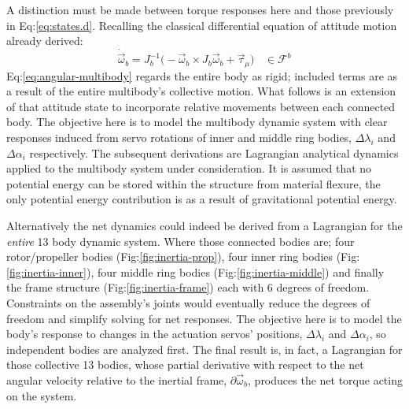 \par
A distinction must be made between torque responses here and those previously in Eq:\ref{eq:states.d}. Recalling the classical differential equation of attitude motion already derived:
\begin{equation}\label{eq:angular-multibody}
\dot{\vec{\omega}}_b=J_b^{-1}\big(-\vec{\omega}_b\times J_b\vec{\omega}_b+\vec{\tau}_\mu\big)~~~~\in\mathcal{F}^b
\end{equation}
Eq:\ref{eq:angular-multibody} regards the entire body as rigid; included terms are as a result of the entire multibody's collective motion. What follows is an extension of that attitude state to incorporate relative movements between each connected body. The objective here is to model the multibody dynamic system with clear responses induced from servo rotations of inner and middle ring bodies, $\Delta\lambda_i$ and $\Delta\alpha_i$ respectively. The subsequent derivations are Lagrangian analytical dynamics applied to the multibody system under consideration. It is assumed that no potential energy can be stored within the structure from material flexure, the only potential energy contribution is as a result of gravitational potential energy.
\par
Alternatively the net dynamics could indeed be derived from a Lagrangian for the \emph{entire} 13 body dynamic system. Where those connected bodies are; four rotor/propeller bodies (Fig:\ref{fig:inertia-prop}), four inner ring bodies (Fig:\ref{fig:inertia-inner}), four middle ring bodies (Fig:\ref{fig:inertia-middle}) and finally the frame structure (Fig:\ref{fig:inertia-frame}) each with 6 degrees of freedom. Constraints on the assembly's joints would eventually reduce the degrees of freedom and simplify solving for net responses. The objective here is to model the body's response to changes in the actuation servos' positions, $\Delta\lambda_i$ and $\Delta\alpha_i$, so independent bodies are analyzed first. The final result is, in fact, a Lagrangian for those collective 13 bodies, whose partial derivative with respect to the net angular velocity relative to the inertial frame, $\partial\vec{\omega}_b$, produces the net torque acting on the system.
